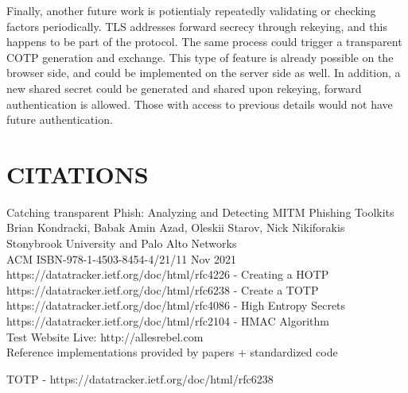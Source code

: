\documentclass[a4paper, 11pt]{article} 				%
\begin{document}
Finally, another future work is potientialy repeatedly validating or checking factors periodically. TLS addresses forward secrecy through rekeying, and this happens to be part of the protocol. The same process could trigger a transparent COTP generation and exchange. This type of feature is already possible on the browser side, and could be implemented on the server side as well. In addition, a new shared secret could be generated and shared upon rekeying, forward authentication is allowed. Those with access to previous details would not have future authentication. 



\section{CITATIONS } 	%

\noindent
[1]Catching transparent Phish: Analyzing and Detecting MITM Phishing Toolkits\\
\noindent 
Brian Kondracki, Babak Amin Azad, Oleskii Starov, Nick Nikiforakis\\
Stonybrook University and Palo Alto Networks\\ 
\noindent
ACM ISBN-978-1-4503-8454-4/21/11 Nov 2021\\

\noindent
[2]https://datatracker.ietf.org/doc/html/rfc4226 - Creating a HOTP\\

\noindent
[3]https://datatracker.ietf.org/doc/html/rfc6238 - Create a TOTP\\ 

\noindent
[4]https://datatracker.ietf.org/doc/html/rfc4086 - High Entropy Secrets\\

\noindent
[5]https://datatracker.ietf.org/doc/html/rfc2104 - HMAC Algorithm\\

\noindent
[6]Test Website Live: http://allesrebel.com\\ 

\noindent
Reference implementations provided by papers + standardized code

\noindent
[7]TOTP - https://datatracker.ietf.org/doc/html/rfc6238
\end{document}
